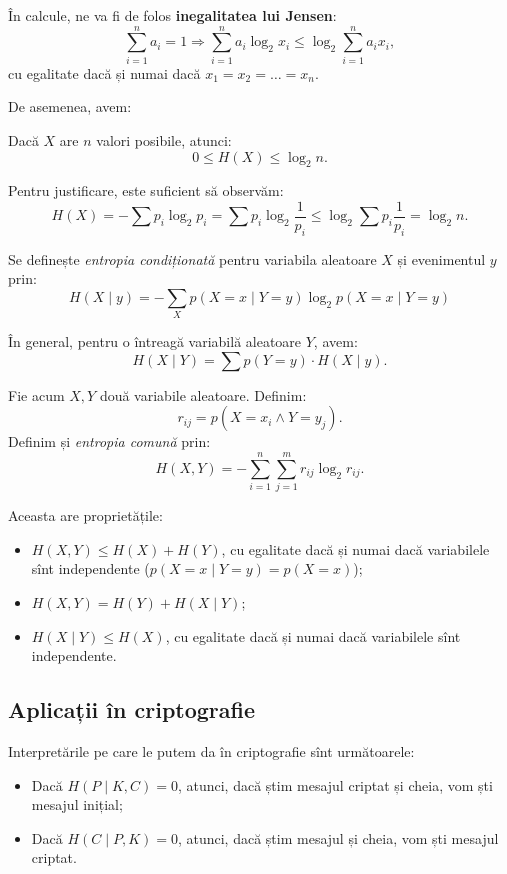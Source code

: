 În calcule, ne va fi de folos \textbf{inegalitatea lui Jensen}:
\[
  \sum_{i = 1}^n a_i = 1 \Rightarrow %
  \sum_{i = 1}^n a_i \log_2 x_i \leq \log_2 \sum_{i = 1}^n a_i x_i,
\]
cu egalitate dacă și numai dacă $ x_1 = x_2 = \dots = x_n $.

De asemenea, avem:
\begin{theorem}\label{thm:entropie}
  Dacă $ X $ are $ n $ valori posibile, atunci:
  \[
    0 \leq H(X) \leq \log_2 n.
  \]
\end{theorem}

Pentru justificare, este suficient să observăm:
\[
  H(X) = - \sum p_i \log_2 p_i = \sum p_i \log_2 \frac{1}{p_i} \leq %
  \log_2 \sum p_i \frac{1}{p_i} = \log_2 n.
\]

\begin{definition}\label{def:entropie-cond}
  Se definește \emph{entropia condiționată} pentru variabila aleatoare $ X $
  și evenimentul $ y $ prin:
  \[
    H(X \mid y) = - \sum_X p(X = x \mid Y = y) \log_2 p(X = x \mid Y = y)
  \]

  În general, pentru o întreagă variabilă aleatoare $ Y $, avem:
  \[
    H(X \mid Y) = \sum p(Y = y) \cdot H(X \mid y).
  \]
\end{definition}

Fie acum $ X, Y $ două variabile aleatoare. Definim:
\[
  r_{ij} = p(X = x_i \land Y = y_j).
\]
Definim și \emph{entropia comună} prin:
\[
  H(X, Y) = - \sum_{i = 1}^n \sum_{j = 1}^m r_{ij} \log_2 r_{ij}.
\]

Aceasta are proprietățile:
\begin{itemize}
\item $ H(X, Y) \leq H(X) + H(Y) $, cu egalitate dacă și numai dacă
  variabilele sînt independente ($p(X = x \mid Y = y) = p(X = x) $);
\item $ H(X, Y) = H(Y) + H(X \mid Y) $;
\item $ H(X \mid Y) \leq H(X) $, cu egalitate dacă și numai dacă
  variabilele sînt independente.
\end{itemize}


\subsection{Aplicații în criptografie}

Interpretările pe care le putem da în criptografie sînt următoarele:
\begin{itemize}
\item Dacă $ H(P \mid K, C) = 0 $, atunci, dacă știm mesajul criptat
  și cheia, vom ști mesajul inițial;
\item Dacă $ H(C \mid P, K) = 0 $, atunci, dacă știm mesajul și cheia,
  vom ști mesajul criptat.
\end{itemize}

